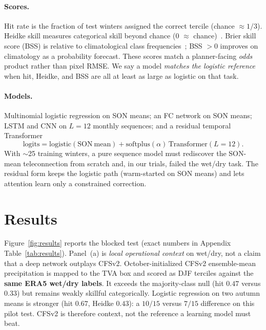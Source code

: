 \documentclass{article}
\begin{document}
\paragraph{Scores.}
Hit rate is the fraction of test winters assigned the correct tercile (chance \(\approx 1/3\)). Heidke skill measures categorical skill beyond chance (\(0\) \(\approx\) chance)~\citep{heidke1926,wilks2011}. Brier skill score (BSS) is relative to climatological class frequencies~\citep{brier1950,wilks2011}; BSS \(>0\) improves on climatology as a probability forecast. These scores match a planner-facing \emph{odds} product rather than pixel RMSE. We say a model \emph{matches the logistic reference} when hit, Heidke, and BSS are all at least as large as logistic on that task.

\paragraph{Models.}
Multinomial logistic regression on SON means; an FC network on SON means; LSTM and CNN on \(L{=}12\) monthly sequences; and a residual temporal Transformer~\citep{vaswani2017attention}
\begin{equation}
\mathrm{logits}=\mathrm{logistic}(\mathrm{SON\ mean})+\mathrm{softplus}(\alpha)\,\mathrm{Transformer}(L{=}12).
\end{equation}
With \(\sim\)25 training winters, a pure sequence model must rediscover the SON-mean teleconnection from scratch and, in our trials, failed the wet/dry task. The residual form keeps the logistic path (warm-started on SON means) and lets attention learn only a constrained correction.

\section{Results}

Figure~\ref{fig:results} reports the blocked test (exact numbers in Appendix Table~\ref{tab:results}).
Panel~(a) is \emph{local operational context} on wet/dry, not a claim that a deep network outplays CFSv2.
October-initialized CFSv2 ensemble-mean precipitation is mapped to the TVA box and scored as DJF terciles against the \textbf{same ERA5 wet/dry labels}.
It exceeds the majority-class null (hit \(0.47\) versus \(0.33\)) but remains weakly skillful categorically.
Logistic regression on two autumn means is stronger (hit \(0.67\), Heidke \(0.43\)): a \(10/15\) versus \(7/15\) difference on this pilot test.
CFSv2 is therefore context, not the reference a learning model must beat.
\end{document}

